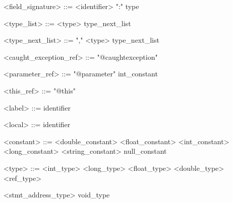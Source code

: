 \documentclass{report}
\begin{document}
\begin{grammar}




<field_signature> ::= <identifier> ":" type

<type_list> ::= <type> type_next_list

<type_next_list> ::= "," <type> type_next_list

<caught_exception_ref> ::= "@caughtexception"

<parameter_ref> ::= "@parameter" int_constant

<this_ref> ::= "@this"

<label> ::= identifier

<local> ::= identifier

<constant> ::= <double_constant> \alt <float_constant> \alt <int_constant> \alt <long_constant>  <string_constant> \alt null_constant

<type> ::= <int_type> \alt <long_type> \alt <float_type> \alt <double_type> \alt <ref_type> 

<stmt_address_type> \alt void_type


\end{grammar}

\end{document}
